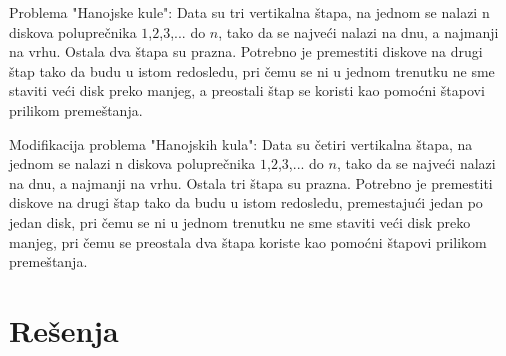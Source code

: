 \begin{Exercise}[label=117]
Problema "Hanojske kule": Data su tri
  vertikalna štapa, na jednom se nalazi n diskova poluprečnika
  $1$,$2$,$3$,... do $n$, tako da se najveći nalazi na dnu, a
  najmanji na vrhu. Ostala dva štapa su prazna. Potrebno je
  premestiti diskove na drugi štap tako da budu u istom redosledu, pri čemu se ni u jednom
  trenutku ne sme staviti veći disk preko manjeg, a preostali štap se koristi kao pomoćni štapovi prilikom
  premeštanja.

\end{Exercise}

\begin{Exercise}[label=118]
Modifikacija problema "Hanojskih kula": Data su četiri
  vertikalna štapa, na jednom se nalazi n diskova poluprečnika
  $1$,$2$,$3$,... do $n$, tako da se najveći nalazi na dnu, a
  najmanji na vrhu. Ostala tri štapa su prazna. Potrebno je
  premestiti diskove na drugi štap tako da budu u istom redosledu,
  premestajući jedan po jedan disk, pri čemu se ni u jednom
  trenutku ne sme staviti veći disk preko manjeg, pri čemu se
  preostala dva štapa koriste kao pomoćni štapovi prilikom
  premeštanja.

\end{Exercise}


\section{Rešenja}
\shipoutAnswer
